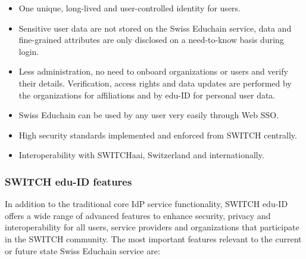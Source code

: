 \begin{itemize}
	\itemsep0em
	\item One unique, long-lived and user-controlled identity for users.
	\item Sensitive user data are not stored on the Swiss Educhain service, data and fine-grained attributes are only disclosed on a need-to-know basis during login.
	\item Less administration, no need to onboard organizations or users and verify their details. Verification, access rights and data updates are performed by the organizations for affiliations and by edu-ID for personal user data.
	\item Swiss Educhain can be used by any user very easily through Web SSO.
	\item High security standards implemented and enforced from SWITCH centrally.
	\item Interoperability with SWITCHaai, Switzerland and internationally.
\end{itemize}


\subsubsection{SWITCH edu-ID features} \label{ssec:eduid-features}

In addition to the traditional core IdP service functionality, SWITCH edu-ID offers a wide range of advanced features to enhance security, privacy and interoperability for all users, service providers and organizations that participate in the SWITCH community. The most important features relevant to the current or future state Swiss Educhain service are:

